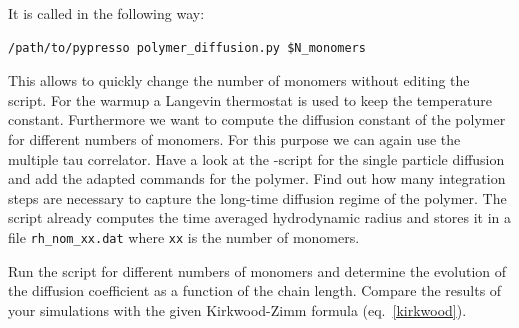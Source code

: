 It is called in the following way:
{\vspace{0,2cm}\small
\begin{lstlisting}[numbers=none]
/path/to/pypresso polymer_diffusion.py $N_monomers  
\end{lstlisting}\vspace{0,2cm}
}
This allows to quickly change the number of monomers without editing 
the script.
For the warmup a Langevin thermostat is used to keep the temperature constant.
Furthermore we want to compute the diffusion constant of the polymer for
different numbers of monomers. For this purpose we can again use the multiple
tau correlator. Have a look at the \ES{} -script for the single particle diffusion
and add the adapted commands for the polymer. Find out how many integration steps are
necessary to capture the long-time diffusion regime of the polymer. The script
already computes the time averaged hydrodynamic radius and stores it in a file
\texttt{rh\_nom\_xx.dat} where \texttt{xx} is the number of monomers.

Run the script for different numbers of monomers and determine the evolution of
the diffusion coefficient as a function of the chain length. Compare the results
of your \ES{} simulations with the given Kirkwood-Zimm formula
(eq.~\ref{kirkwood}). 
